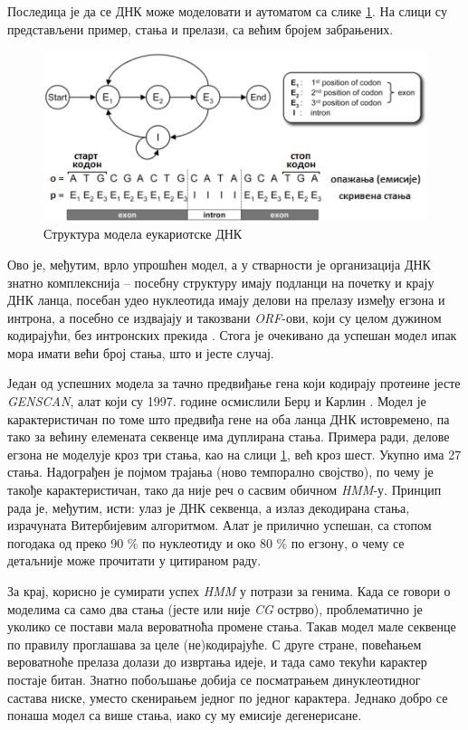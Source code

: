 \documentclass[12pt,oneside]{memoir}
\begin{document}
\begin{CJK}{UTF8}{ipxm}
Последица је да се ДНК може моделовати и аутоматом са слике \ref{fig:eukariote}. На слици су представљени пример, стања и прелази, са већим бројем забрањених.

\begin{figure}[H]
  \centering
  \includegraphics[width=.85\textwidth]{eukariote.png}
  \caption{Структура модела еукариотске ДНК \cite{eukary}}
  \label{fig:eukariote}
\end{figure}

Ово је, међутим, врло упрошћен модел, а у стварности је организација ДНК знатно комплекснија -- посебну структуру имају подланци на почетку и крају ДНК ланца, посебан удео нуклеотида имају делови на прелазу између егзона и интрона, а посебно се издвајају и такозвани \textit{ORF}-ови, који су целом дужином кодирајући, без интронских прекида \cite{henderson1997, huson2020}. Стога је очекивано да успешан модел ипак мора имати већи број стања, што и јесте случај.

Један од успешних модела за тачно предвиђање гена који кодирају протеине јесте \textit{GENSCAN}, алат који су 1997. године осмислили Берџ и Карлин \cite{genscan, burge1997}. Модел је карактеристичан по томе што предвиђа гене на оба ланца ДНК истовремено, па тако за већину елемената секвенце има дуплирана стања. Примера ради, делове егзона не моделује кроз три стања, као на слици \ref{fig:eukariote}, већ кроз шест. Укупно има 27 стања. Надограђен је појмом трајања (ново темпорално својство), по чему је такође карактеристичан, тако да није реч о сасвим обичном \textit{HMM}-у. Принцип рада је, међутим, исти: улаз је ДНК секвенца, а излаз декодирана стања, израчуната Витербијевим алгоритмом. Алат је прилично успешан, са стопом погодака од преко 90 \% по нуклеотиду и око 80 \% по егзону, о чему се детаљније може прочитати у цитираном раду.

За крај, корисно је сумирати успех \textit{HMM} у потрази за генима. Када се говори о моделима са само два стања (јесте или није \textit{CG} острво), проблематично је уколико се постави мала вероватноћа промене стања. Такав модел мале секвенце по правилу проглашава за целе (не)кодирајуће. С друге стране, повећањем вероватноће прелаза долази до извртања идеје, и тада само текући карактер постаје битан. Знатно побољшање добија се посматрањем динуклеотидног састава ниске, уместо скенирањем једног по једног карактера. Једнако добро се понаша модел са више стања, иако су му емисије дегенерисане.


\end{CJK}
\end{document}
